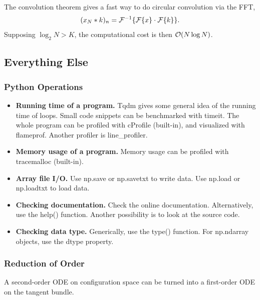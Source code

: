 \documentclass[12pt,letterpaper]{article}
\begin{document}
The convolution theorem gives a fast way to do circular convolution via the FFT,
\[(x_N*k)_n=\mathcal F^{-1}\qty{\mathcal F\qty{x}\cdot\mathcal F\qty{k}}.\]
Supposing $\log_2{N}>K$, the computational cost is then $\order{N\log{N}}$.
\subsection{Everything Else}
\subsubsection{Python Operations}
\begin{itemize}
    \item \textbf{Running time of a program.} Tqdm gives some general idea of the running time of loops. Small code snippets can be benchmarked with timeit. The whole program can be profiled with cProfile (built-in), and visualized with flameprof. Another profiler is line\_profiler.
    \item \textbf{Memory usage of a program.} Memory usage can be profiled with tracemalloc (built-in).
    \item \textbf{Array file I/O.} Use np.save or np.savetxt to write data. Use np.load or np.loadtxt to load data.
    \item \textbf{Checking documentation.} Check the online documentation. Alternatively, use the help() function. Another possibility is to look at the source code.
    \item \textbf{Checking data type.} Generically, use the type() function. For np.ndarray objects, use the dtype property.
\end{itemize}
\subsubsection{Reduction of Order}
A second-order ODE on configuration space can be turned into a first-order ODE on the tangent bundle.
\end{document}
